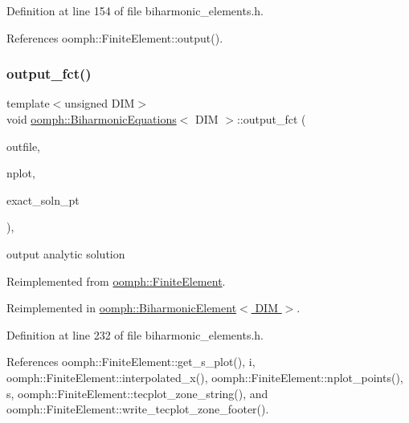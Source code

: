Definition at line 154 of file biharmonic\+\_\+elements.\+h.



References oomph\+::\+Finite\+Element\+::output().

\mbox{\label{classoomph_1_1BiharmonicEquations_aca4e6ea18f47696a4535dfc4e020ee64}} 
\subsubsection{\texorpdfstring{output\+\_\+fct()}{output\_fct()}\hspace{0.1cm}{\footnotesize\ttfamily [1/2]}}
{\footnotesize\ttfamily template$<$unsigned D\+IM$>$ \\
void \hyperlink{classoomph_1_1BiharmonicEquations}{oomph\+::\+Biharmonic\+Equations}$<$ D\+IM $>$\+::output\+\_\+fct (\begin{DoxyParamCaption}\item[{std\+::ostream \&}]{outfile,  }\item[{const unsigned \&}]{nplot,  }\item[{\hyperlink{classoomph_1_1FiniteElement_a690fd33af26cc3e84f39bba6d5a85202}{Finite\+Element\+::\+Steady\+Exact\+Solution\+Fct\+Pt}}]{exact\+\_\+soln\+\_\+pt }\end{DoxyParamCaption})\hspace{0.3cm}{\ttfamily [inline]}, {\ttfamily [virtual]}}



output analytic solution 



Reimplemented from \hyperlink{classoomph_1_1FiniteElement_a22b695c714f60ee6cd145be348042035}{oomph\+::\+Finite\+Element}.



Reimplemented in \hyperlink{classoomph_1_1BiharmonicElement_a1c2dd136ac2a0f263c6a444a3db5a750}{oomph\+::\+Biharmonic\+Element$<$ D\+I\+M $>$}.



Definition at line 232 of file biharmonic\+\_\+elements.\+h.



References oomph\+::\+Finite\+Element\+::get\+\_\+s\+\_\+plot(), i, oomph\+::\+Finite\+Element\+::interpolated\+\_\+x(), oomph\+::\+Finite\+Element\+::nplot\+\_\+points(), s, oomph\+::\+Finite\+Element\+::tecplot\+\_\+zone\+\_\+string(), and oomph\+::\+Finite\+Element\+::write\+\_\+tecplot\+\_\+zone\+\_\+footer().



